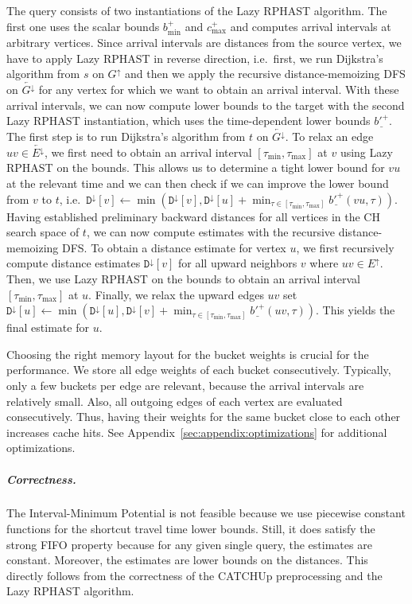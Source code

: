 \documentclass[a4paper,UKenglish,cleveref, autoref, thm-restate,anonymous]{lipics-v2021}
\newcommand*{\comb}{c}
\newcommand*{\gchu}{G^{\uparrow}}
\newcommand*{\gchd}{\overleftarrow{G^{\downarrow}}}
\newcommand*{\echu}{E^{\uparrow}}
\newcommand*{\echd}{\overleftarrow{E^{\downarrow}}}
\newcommand*{\pcfn}{\underline{b'^+}}
\begin{document}
The query consists of two instantiations of the Lazy RPHAST algorithm.
The first one uses the scalar bounds $b^+_{\min}$ and $\comb^+_{\max}$ and computes arrival intervals at arbitrary vertices.
Since arrival intervals are distances from the source vertex, we have to apply Lazy RPHAST in reverse direction, i.e.\ first, we run Dijkstra's algorithm from $s$ on $\gchu$ and then we apply the recursive distance-memoizing DFS on $\gchd$ for any vertex for which we want to obtain an arrival interval.
With these arrival intervals, we can now compute lower bounds to the target with the second Lazy RPHAST instantiation, which uses the time-dependent lower bounds $\pcfn$.
The first step is to run Dijkstra's algorithm from $t$ on $\gchd$.
To relax an edge $uv \in \echd$, we first need to obtain an arrival interval $[\tau_{\min}, \tau_{\max}]$ at $v$ using Lazy RPHAST on the bounds.
This allows us to determine a tight lower bound for $vu$ at the relevant time and we can then check if we can improve the lower bound from $v$ to $t$, i.e.\
$\mathtt{D}^{\downarrow}[v] \leftarrow \min(\mathtt{D}^{\downarrow}[v], \mathtt{D}^{\downarrow}[u] + \min_{\tau \in [\tau_{\min}, \tau_{\max}]} \pcfn(vu, \tau))$.
Having established preliminary backward distances for all vertices in the CH search space of $t$, we can now compute estimates with the recursive distance-memoizing DFS.
To obtain a distance estimate for vertex $u$, we first recursively compute distance estimates $\mathtt{D}^{\downarrow}[v]$ for all upward neighbors $v$ where $uv \in \echu$.
Then, we use Lazy RPHAST on the bounds to obtain an arrival interval $[\tau_{\min}, \tau_{\max}]$ at $u$.
Finally, we relax the upward edges $uv$ set $\mathtt{D}^{\downarrow}[u] \leftarrow \min(\mathtt{D}^{\downarrow}[u], \mathtt{D}^{\downarrow}[v] + \min_{\tau \in [\tau_{\min}, \tau_{\max}]} \pcfn(uv, \tau))$.
This yields the final estimate for $u$.

Choosing the right memory layout for the bucket weights is crucial for the performance.
We store all edge weights of each bucket consecutively.
Typically, only a few buckets per edge are relevant, because the arrival intervals are relatively small.
Also, all outgoing edges of each vertex are evaluated consecutively.
Thus, having their weights for the same bucket close to each other increases cache hits.
See Appendix~\ref{sec:appendix:optimizations} for additional optimizations.

\subparagraph{Correctness.}
The Interval-Minimum Potential is not feasible because we use piecewise constant functions for the shortcut travel time lower bounds.
Still, it does satisfy the strong FIFO property because for any given single query, the estimates are constant.
Moreover, the estimates are lower bounds on the distances.
This directly follows from the correctness of the CATCHUp preprocessing and the Lazy RPHAST algorithm.
\end{document}
